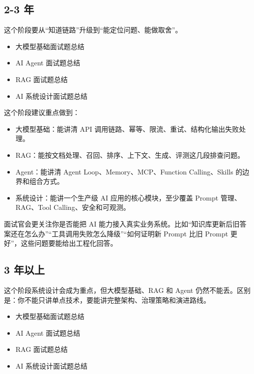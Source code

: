 \documentclass[9pt,a4paper,twocolumn]{ctexart}
\begin{document}
\subsection*{2-3 年}


这个阶段要从“知道链路”升级到“能定位问题、能做取舍”。


\begin{itemize}[itemsep=1pt, topsep=2pt]
  \item 大模型基础面试题总结
  \item AI Agent 面试题总结
  \item RAG 面试题总结
  \item AI 系统设计面试题总结
\end{itemize}


这个阶段建议重点做到：


\begin{itemize}[itemsep=1pt, topsep=2pt]
  \item 大模型基础：能讲清 API 调用链路、幂等、限流、重试、结构化输出失败处理。
  \item RAG：能按文档处理、召回、排序、上下文、生成、评测这几段排查问题。
  \item Agent：能讲清 Agent Loop、Memory、MCP、Function Calling、Skills 的边界和组合方式。
  \item 系统设计：能讲一个生产级 AI 应用的核心模块，至少覆盖 Prompt 管理、RAG、Tool Calling、安全和可观测。
\end{itemize}


面试官会更关注你是否能把 AI 能力接入真实业务系统。比如“知识库更新后旧答案还在怎么办”“工具调用失败怎么降级”“如何证明新 Prompt 比旧 Prompt 更好”，这些问题要能给出工程化回答。



\subsection*{3 年以上}


这个阶段系统设计会成为重点，但大模型基础、RAG 和 Agent 仍然不能丢。区别是：你不能只讲单点技术，要能讲完整架构、治理策略和演进路线。


\begin{itemize}[itemsep=1pt, topsep=2pt]
  \item 大模型基础面试题总结
  \item AI Agent 面试题总结
  \item RAG 面试题总结
  \item AI 系统设计面试题总结
\end{itemize}
\end{document}
